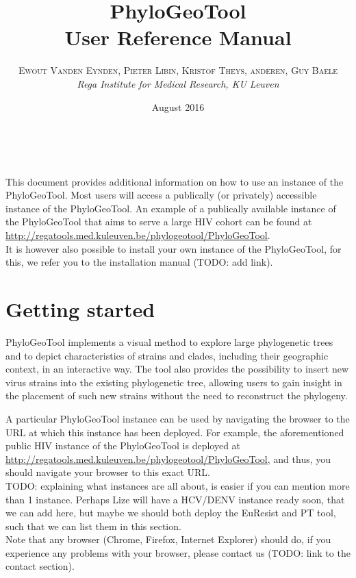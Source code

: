 \documentclass[a4paper, 11pt]{article} %
\title{\textbf{PhyloGeoTool}\\ %
User Reference Manual} %
\author{\textsc{Ewout Vanden Eynden, Pieter Libin, Kristof Theys, anderen, Guy Baele} %
\\{\textit{Rega Institute for Medical Research, KU Leuven}}} %
\date{August 2016} %
\makeatletter
\renewcommand{\maketitle}{ %
\begin{flushright} %
{\LARGE\@title} %

\vspace{50pt} %

{\large\@author} %
\\\@date %

\vspace{40pt} %
\end{flushright}
}
\makeatother
\begin{document}
\maketitle %

\vspace{30pt} %

\tableofcontents
\newpage

This document provides additional information on how to use an instance of the PhyloGeoTool. Most users will access a publically (or privately) accessible instance of the PhyloGeoTool. An example of a publically available instance of the PhyloGeoTool that aims to serve a large HIV cohort can be found at \url{http://regatools.med.kuleuven.be/phylogeotool/PhyloGeoTool}.\\
It is however also possible to install your own instance of the PhyloGeoTool, for this, we refer you to the installation manual (TODO: add link).

\section{Getting started}

PhyloGeoTool implements a visual method to explore large phylogenetic trees and to depict characteristics of strains and clades, including their geographic context, in an interactive way.
The tool also provides the possibility to insert new virus strains into the existing phylogenetic tree, allowing users to gain insight in the placement of such new strains without the need to reconstruct the phylogeny.

A particular PhyloGeoTool instance can be used by navigating the browser to the URL at which this instance has been deployed. For example, the aforementioned public HIV instance of the PhyloGeoTool is deployed at \url{http://regatools.med.kuleuven.be/phylogeotool/PhyloGeoTool}, and thus, you should navigate your browser to this exact URL.\\
TODO: explaining what instances are all about, is easier if you can mention more than 1 instance. Perhaps Lize will have a HCV/DENV instance ready soon, that we can add here, but maybe we should both deploy the EuResist and PT tool, such that we can list them in this section.\\
Note that any browser (Chrome, Firefox, Internet Explorer) should do, if you experience any problems with your browser, please contact us (TODO: link to the contact section).
\end{document}
